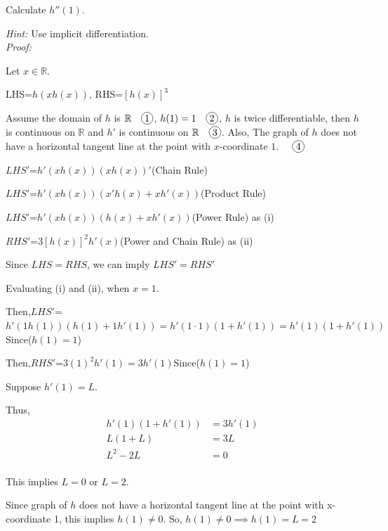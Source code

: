 \documentclass[12pt]{exam}
\newcommand*\circled[1]{\tikz[baseline=(char.base)]{
    \node[shape=circle, draw, inner sep=1pt, 
        minimum height=12pt] (char) {#1};}}
\newcommand {\DS} [1] {${\displaystyle #1}$}
\newcommand{\vv}{\vspace{.4cm}}
\newcommand{\R}{\mathbb{R}}
\begin{document}
\begin{enumerate}[resume]
	Calculate \DS{h''(1)}.
	
	\emph{Hint:} Use implicit differentiation.
	\vv
	\\
	
	\emph{Proof:}

	Let $x\in\R$.

	LHS=$h(xh(x))$, RHS=$[h(x)]^3$

	Assume the domain of $h$ is $\R \quad \circled{1}$, $h(1)=1 \quad \circled{2}$,
	$h$ is twice differentiable, 
	then $h$ is continuous on $\R$ and $h'$ is continuous on $\R \quad \circled{3}$.
	Also, The graph of $h$ does not have a horizontal tangent line at the point with $x$-coordinate $1$. $\quad \circled{4}$

	\DS{LHS'}=$h'(xh(x))(xh(x))'$\qquad(Chain Rule)

	\DS{LHS'}=$h'(xh(x))(x'h(x)+xh'(x))$\qquad(Product Rule)

	\DS{LHS'}=$h'(xh(x))(h(x)+xh'(x))$\qquad(Power Rule) as \quad (i)

	\DS{RHS'}=$3[h(x)]^2h'(x)$\qquad(Power and Chain Rule) as \quad (ii)

	Since $LHS=RHS$, we can imply $LHS'=RHS'$

	Evaluating (i) and (ii), when $x=1$. 

	Then,\DS{LHS'}=$h'(1h(1))(h(1)+1h'(1))=h'(1\cdot1)(1+h'(1))=h'(1)(1+h'(1))$\qquad Since($h(1)=1$)

	Then,\DS{RHS'}=$3(1)^2h'(1)=3h'(1)$\qquad Since($h(1)=1$)

	Suppose $h'(1)=L.$

	Thus,
	\begin{align*}
	    h'(1)(1+h'(1))&=3h'(1) \\
	    L(1+L)&=3L \\
	    L^2-2L&=0 \\
	\end{align*}


	This implies $L=0$ or $L=2.$

	Since graph of $h$ does not have a horizontal tangent line at the point with x-coordinate 1, this implies $h(1)\neq0$.
	So, $h(1)\neq 0 \implies h(1)=L=2$\\


\end{enumerate}
\end{document}
